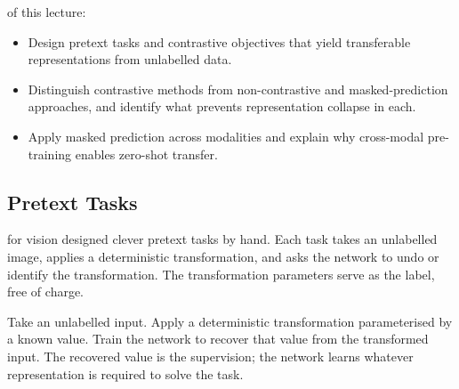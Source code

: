 \vspace{2.5em}

 of this lecture:
\begin{itemize}
    \item Design pretext tasks and contrastive objectives that yield transferable representations from unlabelled data.
    \item Distinguish contrastive methods from non-contrastive and masked-prediction approaches, and identify what prevents representation collapse in each.
    \item Apply masked prediction across modalities and explain why cross-modal pre-training enables zero-shot transfer.
\end{itemize}



\newpage


\subsection{Pretext Tasks}


 for vision designed clever pretext tasks by hand.
Each task takes an unlabelled image, applies a deterministic transformation, and asks the network to undo or identify the transformation.
The transformation parameters serve as the label, free of charge.

Take an unlabelled input.
Apply a deterministic transformation parameterised by a known value.
Train the network to recover that value from the transformed input.
The recovered value is the supervision; the network learns whatever representation is required to solve the task.

